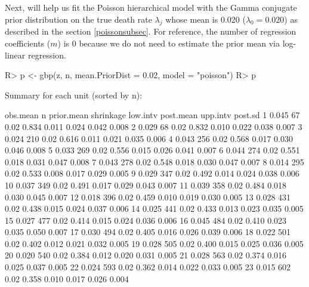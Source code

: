 \documentclass[article]{jss}
\begin{document}
Next,  will help us fit the Poisson hierarchical model with the Gamma conjugate prior distribution on the true death rate $\lambda_{j}$ whose mean is 0.020 ($\lambda_{0}=0.020$) as described in the section \ref{poissonsubsec}. For reference, the number of regression coefficients ($m$) is 0 because we do not need to estimate the prior mean via log-linear regression.
\begin{CodeChunk}
\begin{CodeInput}
R> p <- gbp(z, n, mean.PriorDist = 0.02, model = "poisson")
R> p
\end{CodeInput}
\begin{CodeOutput}
Summary for each unit (sorted by n):

         obs.mean    n prior.mean shrinkage low.intv post.mean upp.intv post.sd
1           0.045   67       0.02     0.834    0.011     0.024    0.042   0.008
2           0.029   68       0.02     0.832    0.010     0.022    0.038   0.007
3           0.024  210       0.02     0.616    0.011     0.021    0.035   0.006
4           0.043  256       0.02     0.568    0.017     0.030    0.046   0.008
5           0.033  269       0.02     0.556    0.015     0.026    0.041   0.007
6           0.044  274       0.02     0.551    0.018     0.031    0.047   0.008
7           0.043  278       0.02     0.548    0.018     0.030    0.047   0.007
8           0.014  295       0.02     0.533    0.008     0.017    0.029   0.005
9           0.029  347       0.02     0.492    0.014     0.024    0.038   0.006
10          0.037  349       0.02     0.491    0.017     0.029    0.043   0.007
11          0.039  358       0.02     0.484    0.018     0.030    0.045   0.007
12          0.018  396       0.02     0.459    0.010     0.019    0.030   0.005
13          0.028  431       0.02     0.438    0.015     0.024    0.037   0.006
14          0.025  441       0.02     0.433    0.013     0.023    0.035   0.005
15          0.027  477       0.02     0.414    0.015     0.024    0.036   0.006
16          0.045  484       0.02     0.410    0.023     0.035    0.050   0.007
17          0.030  494       0.02     0.405    0.016     0.026    0.039   0.006
18          0.022  501       0.02     0.402    0.012     0.021    0.032   0.005
19          0.028  505       0.02     0.400    0.015     0.025    0.036   0.005
20          0.020  540       0.02     0.384    0.012     0.020    0.031   0.005
21          0.028  563       0.02     0.374    0.016     0.025    0.037   0.005
22          0.024  593       0.02     0.362    0.014     0.022    0.033   0.005
23          0.015  602       0.02     0.358    0.010     0.017    0.026   0.004

\end{CodeOutput}
\end{CodeChunk}
\end{document}
